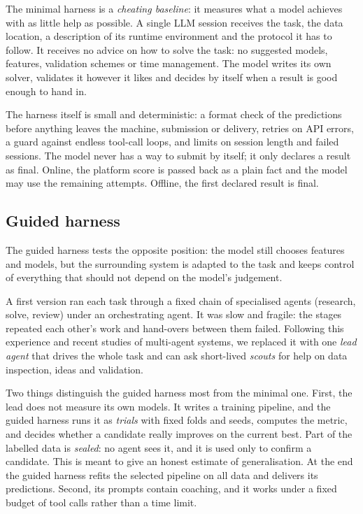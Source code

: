 \documentclass[letterpaper,twocolumn,10pt]{article}
\begin{document}
The minimal harness is a \emph{cheating baseline}: it measures what a model
achieves with as little help as possible. A single LLM session receives the
task, the data location, a description of its runtime environment and the
protocol it has to follow. It receives no advice on how to solve the task:
no suggested models, features, validation schemes or time management. The
model writes its own solver, validates it however it likes and decides by
itself when a result is good enough to hand in.

The harness itself is small and deterministic: a format check
of the predictions before anything leaves the machine, submission or
delivery, retries on API errors, a guard against endless tool-call loops,
and limits on session length and failed sessions. The model never has a way
to submit by itself; it only declares a result as final. Online, the
platform score is passed back as a plain fact and the model may use the
remaining attempts. Offline, the first declared result is final.

\subsection{Guided harness}

The guided harness tests the opposite position: the model still chooses
features and models, but the surrounding system is adapted to the task and
keeps control of everything that should not depend on the model's judgement.

A first version ran each task through a fixed chain of specialised agents
(research, solve, review) under an orchestrating agent. It was slow and
fragile: the stages repeated each other's work and hand-overs between them
failed. Following this experience and recent studies of multi-agent
systems, we replaced it with one \emph{lead agent} that drives the whole
task and can ask short-lived \emph{scouts} for help on data inspection,
ideas and validation.

Two things distinguish the guided harness most from the minimal one.
First, the lead does not measure its own models. It writes a training
pipeline, and the guided harness runs it as \emph{trials} with fixed folds and
seeds, computes the metric, and decides whether a candidate really improves
on the current best. Part of the labelled data is \emph{sealed}: no agent
sees it, and it is used only to confirm a candidate. This is meant to give
an honest estimate of generalisation. At the end the guided harness refits the
selected pipeline on all data and delivers its predictions. Second, its
prompts contain coaching, and it works under a fixed budget of tool calls
rather than a time limit.
\end{document}
